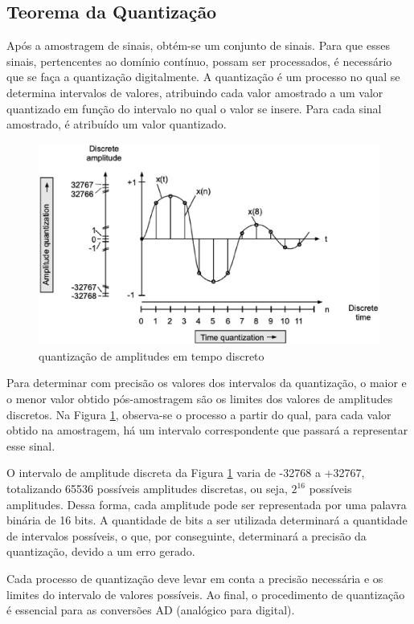 \subsection{Teorema da Quantização}

Após a amostragem de sinais, obtém-se um conjunto de sinais. Para que esses sinais, pertencentes ao domínio contínuo, possam ser processados, é necessário que se faça a quantização digitalmente. A quantização é um processo no qual se determina intervalos de valores, atribuindo cada valor amostrado a um valor quantizado em função do intervalo no qual o valor se insere. Para cada sinal amostrado, é atribuído um valor quantizado.

\begin{figure}[h]
	\centering
    \includegraphics[scale=0.4]{figuras/fig04.eps}
	\caption{quantização de amplitudes em tempo discreto \cite{oppenheim2010sinais}}
	\label{fig04}
\end{figure}

Para determinar com precisão os valores dos intervalos da quantização, o maior e o menor valor obtido pós-amostragem são os limites dos valores de amplitudes discretos. Na Figura \ref{fig04}, observa-se o processo a partir do qual, para cada valor obtido na amostragem, há um intervalo correspondente que passará a representar esse sinal.
\par O intervalo de amplitude discreta da Figura \ref{fig04} varia de -32768 a +32767, totalizando 65536 possíveis amplitudes discretas, ou seja, $2^{16}$ possíveis amplitudes. Dessa forma, cada amplitude pode ser representada por uma palavra binária de 16 bits. A quantidade de bits a ser utilizada determinará a quantidade de intervalos possíveis, o que, por conseguinte, determinará a precisão da quantização, devido a um erro gerado.
\par Cada processo de quantização deve levar em conta a precisão necessária e os limites do intervalo de valores possíveis. Ao final, o procedimento de quantização é essencial para as conversões AD (analógico para digital).

